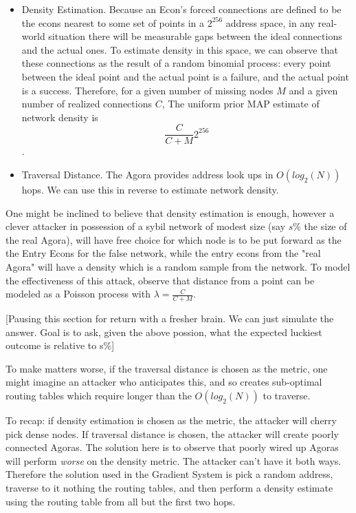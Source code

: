 \documentclass{article}
\begin{document}
\begin{itemize}
    \item Density Estimation. Because an Econ's forced connections are defined to be the econs nearest to some set of points in a $2^{256}$ address space, in any real-world situation there will be measurable gaps between the ideal connections and the actual ones. To estimate density in this space, we can observe that these connections as the result of a random binomial process: every point between the ideal point and the actual point is a failure, and the actual point is a success. Therefore, for a given number of missing nodes $M$ and a given number of realized connections $C$, The uniform prior MAP estimate of network density is $$\frac{C}{C + M} 2^{256}$$.
    \item Traversal Distance. The Agora provides address look ups in $O(log_2(N))$ hops. We can use this in reverse to estimate network density.
\end{itemize}

One might be inclined to believe that density estimation is enough, however a clever attacker in possession of a sybil network of modest size (say $s$\% the size of the real Agora), will have free choice for which node is to be put forward as the the Entry Econs for the false network, while the entry econs from the "real Agora" will have a density which is a random sample from the network. To model the effectiveness of this attack, observe that distance from a point can be modeled as a Poisson process with $\lambda = \frac{C}{C+M}$.

[Pausing this section for return with a fresher brain. We can just simulate the answer. Goal is to ask, given the above possion, what the expected luckiest outcome is relative to s\%]

To make matters worse, if the traversal distance is chosen as the metric, one might imagine an attacker who anticipates this, and so creates sub-optimal routing tables which require longer than the $O(log_2(N))$ to traverse.

To recap: if density estimation is chosen as the metric, the attacker will cherry pick dense nodes. If traversal distance is chosen, the attacker will create poorly connected Agoras. The solution here is to observe that poorly wired up Agoras will perform \emph{worse} on the density metric. The attacker can't have it both ways. Therefore the solution used in the Gradient System is pick a random address, traverse to it nothing the routing tables, and then perform a density estimate using the routing table from all but the first two hops.
\end{document}
